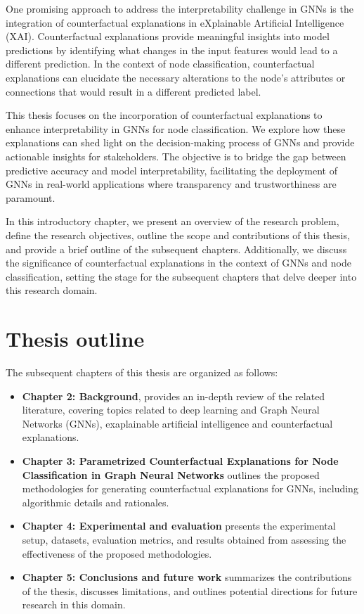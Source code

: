\documentclass[binding=0.6cm]{sapthesis}
\begin{document}
One promising approach to address the interpretability challenge in GNNs is the integration of counterfactual explanations in eXplainable Artificial Intelligence (XAI\footnotemark). Counterfactual explanations provide meaningful insights into model predictions by identifying what changes in the input features would lead to a different prediction. In the context of node classification, counterfactual explanations can elucidate the necessary alterations to the node's attributes or connections that would result in a different predicted label.



This thesis focuses on the incorporation of counterfactual explanations to enhance interpretability in GNNs for node classification. We explore how these explanations can shed light on the decision-making process of GNNs and provide actionable insights for stakeholders. The objective is to bridge the gap between predictive accuracy and model interpretability, facilitating the deployment of GNNs in real-world applications where transparency and trustworthiness are paramount.

In this introductory chapter, we present an overview of the research problem, define the research objectives, outline the scope and contributions of this thesis, and provide a brief outline of the subsequent chapters. Additionally, we discuss the significance of counterfactual explanations in the context of GNNs and node classification, setting the stage for the subsequent chapters that delve deeper into this research domain.

\section{Thesis outline}
The subsequent chapters of this thesis are organized as follows:
\begin{itemize}
    \item \textbf{Chapter 2: Background}, provides an in-depth review of the related literature, covering topics related to deep learning and Graph Neural Networks (GNNs), exaplainable artificial intelligence and counterfactual explanations.
    \item \textbf{Chapter 3: Parametrized Counterfactual Explanations for Node Classification in Graph Neural Networks} outlines the proposed methodologies for generating counterfactual explanations for GNNs, including algorithmic details and rationales.
    \item \textbf{Chapter 4: Experimental and evaluation} presents the experimental setup, datasets, evaluation metrics, and results obtained from assessing the effectiveness of the proposed methodologies.
    \item \textbf{Chapter 5: Conclusions and future work} summarizes the contributions of the thesis, discusses limitations, and outlines potential directions for future research in this domain.
\end{itemize}
\end{document}
